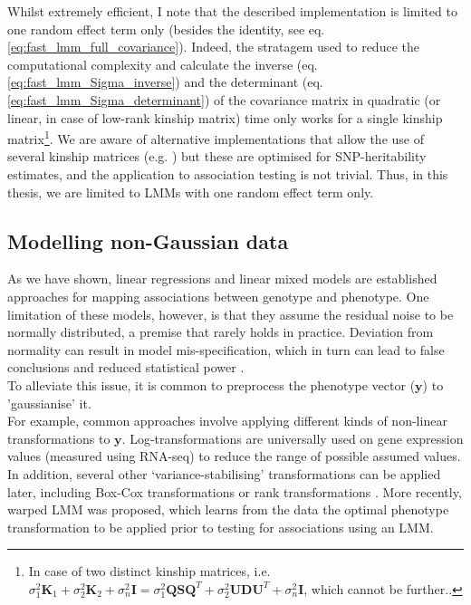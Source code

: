 Whilst extremely efficient, I note that the described implementation is limited to one random effect term only (besides the identity, see eq. \eqref{eq:fast_lmm_full_covariance}).
Indeed, the stratagem used to reduce the computational complexity and calculate the inverse (eq. \eqref{eq:fast_lmm_Sigma_inverse}) and the determinant (eq. \eqref{eq:fast_lmm_Sigma_determinant}) of the covariance matrix in quadratic (or linear, in case of low-rank kinship matrix) time only works for a single kinship matrix\footnote{In case of two distinct kinship matrices, i.e. $\sigma_1^2\mathbf{K}_1 + \sigma_2^2\mathbf{K}_2 + \sigma_n^2\mathbf{I} = \sigma_1^2\mathbf{Q}\mathbf{S}\mathbf{Q}^T + \sigma_2^2\mathbf{U}\mathbf{D}\mathbf{U}^T + \sigma_n^2\mathbf{I}$, which cannot be further..}.
We are aware of alternative implementations that allow the use of several kinship matrices (e.g. \cite{pazokitoroudi2020efficient}) but these are optimised for SNP-heritability estimates, and the application to association testing is not trivial.
Thus, in this thesis, we are limited to LMMs with one random effect term only.




\subsection{Modelling non-Gaussian data}
\label{sec:non_gaussian}

As we have shown, linear regressions and linear mixed models are established approaches for mapping associations between genotype and phenotype. 
One limitation of these models, however, is that they assume the residual noise to be normally distributed, a premise that rarely holds in practice. 
Deviation from normality can result in model mis-specification, which in turn can lead to false conclusions and reduced statistical power \cite{mcculloch2014generalized}.  \\

To alleviate this issue, it is common to preprocess the phenotype vector ($\mathbf{y}$) to 'gaussianise' it. 
\\

For example, common approaches involve applying different kinds of non-linear transformations to $\mathbf{y}$. 
Log-transformations are universally used on gene expression values (measured using RNA-seq) to reduce the range of possible assumed values.
In addition, several other `variance-stabilising' transformations can be applied later, including Box-Cox transformations \cite{box1964analysis} or rank transformations \cite{zhou2014efficient}.
More recently, warped LMM \cite{fusi2014warped} was proposed, which learns from the data the optimal phenotype transformation to be applied prior to testing for associations using an LMM. 
\\

